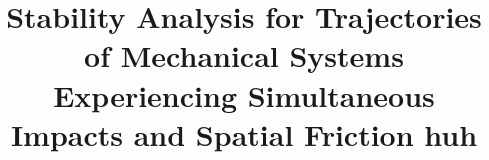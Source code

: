 \newcommand{\mytitle}{Stability Analysis for Trajectories of Mechanical Systems Experiencing Simultaneous Impacts and Spatial Friction huh}
\title{\mytitle}






\pagestyle{plain} %
%




\tableofcontents








\cleartooddpage
{}








